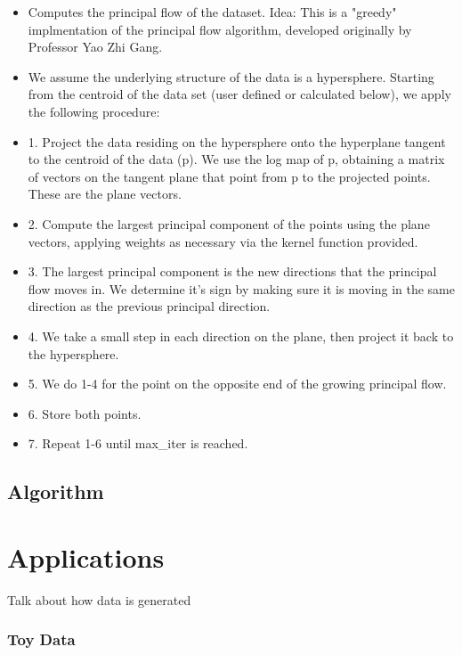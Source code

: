 \documentclass[12pt]{report}
\begin{document}
\begin{itemize}
    \item Computes the principal flow of the dataset. 
    Idea: This is a "greedy" implmentation of the principal flow 
    algorithm, developed originally by Professor Yao Zhi Gang.
    
    \item We assume the underlying structure of the data is a hypersphere.
    Starting from the centroid of the data set (user defined or calculated below), we apply the following procedure: 
    \item 1. Project the data residing on the hypersphere onto the hyperplane
    tangent to the centroid of the data (p). We use the log map of p, 
    obtaining a matrix of vectors on the tangent plane that point from p
    to the projected points. These are the plane vectors.

    \item 2. Compute the largest principal component of the points using the plane vectors, applying weights as necessary via the kernel function provided.

    \item 3. The largest principal component is the new directions that the principal flow moves in. We determine it's sign by making sure it is moving in the same direction as the previous principal direction.

    \item 4. We take a small step in each direction on the plane,
    then project it back to the hypersphere.

    \item 5. We do 1-4 for the point on the opposite end of the growing principal flow.

    \item 6. Store both points. 
    
    \item 7. Repeat 1-6 until max\_iter is reached.
\end{itemize}

\section{Algorithm}

\chapter*{Applications}
Talk about how data is generated
\subsection{Toy Data}
\end{document}
